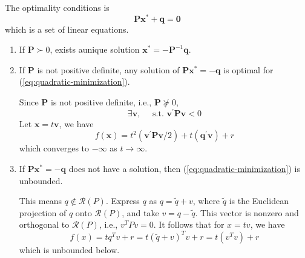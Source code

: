 \begin{solution}
    The optimality conditions is
    \begin{equation*}
        \mathbf{P}\mathbf{x}^{*}+\mathbf{q}=\mathbf{0}
    \end{equation*}
    which is a set of linear equations.
    \begin{enumerate}
        \item If $\mathbf{P}\succ 0$, exists aunique solution $\mathbf{x}^{*}=-\mathbf{P}^{-1}\mathbf{q}$.

        \item If $\mathbf{P}$ is not positive definite, any solution of $\mathbf{P}\mathbf{x}^{*}=-\mathbf{q}$ is optimal for (\ref{eq:quadratic-minimization}).

              Since $\mathbf{P}$ is not positive definite, i.e., $\mathbf{P}\nsucceq 0$,
              \begin{equation*}
                  \exists\mathbf{v},\quad\text{ s.t. }\mathbf{v}^{\prime}\mathbf{P}\mathbf{v}<0
              \end{equation*}
              Let $\mathbf{x}=t\mathbf{v}$, we have
              \begin{equation*}
                  f\left(\mathbf{x}\right)=t^{2}\left(\mathbf{v}^{\prime}\mathbf{P}\mathbf{v}/2\right)+t\left(\mathbf{q}^{\prime}\mathbf{v}\right)+r
              \end{equation*}
              which converges to $-\infty$ as $t\rightarrow\infty$.

        \item If $\mathbf{P}\mathbf{x}^{*}=-\mathbf{q}$ does not have a solution, then (\ref{eq:quadratic-minimization}) is unbounded.

              This means $q \notin \mathcal{R}(P)$. Express $q$ as $q=\tilde{q}+v$, where $\tilde{q}$ is the Euclidean projection of $q$ onto $\mathcal{R}(P)$, and take $v=q-\tilde{q}$. This vector is nonzero and orthogonal to $\mathcal{R}(P)$,
              i.e., $v^{T} P v=0$. It follows that for $x=t v$, we have
              $$
                  f(x)=t q^{T} v+r=t(\tilde{q}+v)^{T} v+r=t\left(v^{T} v\right)+r
              $$
              which is unbounded below.
    \end{enumerate}
\end{solution}

\begin{example}

\end{example}

